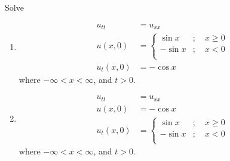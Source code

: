 \documentclass[fleqn, a4paper, 11pt, oneside]{amsart}
\theoremstyle{definition}
\theoremstyle{theorem}
\begin{document}
\begin{question}
	Solve
	\begin{enumerate}
		\item
			\begin{align*}
				u_{t t} &= u_{x x}\\
				u(x,0) &=
					\begin{cases}
						\sin x  & ;\quad x \ge 0 \\
						-\sin x & ;\quad x < 0   \\
					\end{cases}\\
				u_t(x,0) &= -\cos x
			\end{align*}
			where $-\infty < x < \infty$, and $t > 0$.
		\item
			\begin{align*}
				u_{t t} &= u_{x x}\\
				u(x,0) &= -\cos x\\
				u_t(x,0) &=
					\begin{cases}
						\sin x  & ;\quad x \ge 0 \\
						-\sin x & ;\quad x < 0   \\
					\end{cases}
			\end{align*}
			where $-\infty < x < \infty$, and $t > 0$.
	\end{enumerate}
\end{question}
\end{document}
